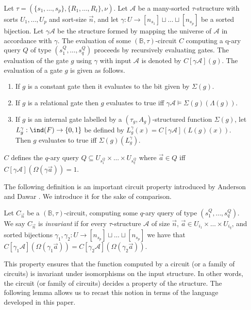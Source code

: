 \documentclass[../paper.tex]{subfiles}
\begin{document}
Let $\tau = (\{s_1, \ldots, s_p\}, \{R_1, \ldots , R_t\}, \nu)$. Let
$\mathcal{A}$ be a many-sorted $\tau$-structure with sorts $U_1, \ldots, U_p$
and sort-size $\vec{n}$, and let $\gamma: U \rightarrow [n_{s_1}] \sqcup \ldots
\sqcup [n_{s_p}]$ be a sorted bijection. Let $\gamma \mathcal{A}$ be the
structure formed by mapping the universe of $\mathcal{A}$ in accordance with
$\gamma$. The evaluation of some $(\mathbb{B}, \tau)$-circuit $C$ computing a
q-ary query $Q$ of type $(s^Q_{1}, \ldots , s^Q_{q})$ proceeds by recursively
evaluating gates. The evaluation of the gate $g$ using $\gamma$ with input
$\mathcal{A}$ is denoted by $C[\gamma \mathcal{A}](g)$. The evaluation of a gate
$g$ is given as follows.
\begin{enumerate}
  \setlength\itemsep{0mm}
\item If $g$ is a constant gate then it evaluates to the bit given by
  $\Sigma(g)$.
\item If $g$ is a relational gate then $g$ evaluates to true iff $\gamma
  \mathcal{A} \models \Sigma(g)(\Lambda (g))$.
\item If $g$ is an internal gate labelled by a $(\tau_g, A_g)$-structured
  function $\Sigma(g)$, let $L^{\gamma}_g: \ind(F) \rightarrow \{0,1\}$ be
  defined by $L^{\gamma}_g(x) = C[\gamma \mathcal{A}](L(g)(x))$. Then $g$
  evaluates to true iff $\Sigma(g) (L^{\gamma}_g)$.
\end{enumerate}
$C$ defines the $q$-ary query $Q \subseteq U_{s^Q_1} \times \ldots \times
U_{s^Q_q}$ where $\vec{a} \in Q$ iff $C[\gamma \mathcal{A}](\Omega (\gamma
\vec{a})) = 1$.

The following definition is an important circuit property introduced by Anderson
and Dawar \cite{AndersonD17}. We introduce it for the sake of comparison.

\begin{definition}
  Let $C_{\vec{n}}$ be a $(\mathbb{B}, \tau)$-circuit, computing some $q$-ary
  query of type $(s^Q_1, \ldots , s^Q_q)$. We say $C_{\vec{n}}$ is
  \emph{invariant} if for every $\tau$-structure $\mathcal{A}$ of size
  $\vec{n}$, $\vec{a} \in U_{i_1} \times \ldots \times U_{i_q}$, and sorted
  bijections $\gamma_1, \gamma_2: U \rightarrow [n_{s_p}] \sqcup\ldots \sqcup
  [n_{s_p}]$ we have that $C[\gamma_1 \mathcal{A}](\Omega (\gamma_1 \vec{a})) =
  C[\gamma_2 \mathcal{A}](\Omega (\gamma_2 \vec{a}))$.
\end{definition}

This property ensures that the function computed by a circuit (or a family of
circuits) is invariant under isomorphisms on the input structure. In other
words, the circuit (or family of circuits) decides a property of the structure.
The following lemma allows us to recast this notion in terms of the language
developed in this paper.
\end{document}
